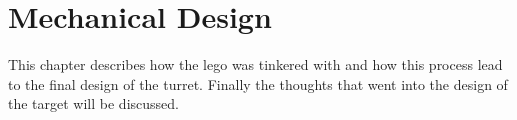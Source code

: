 \chapter{Mechanical Design}

This chapter describes how the lego was tinkered with and how this process
lead to the final design of the turret.
Finally the thoughts that went into the design of the target will be discussed.


